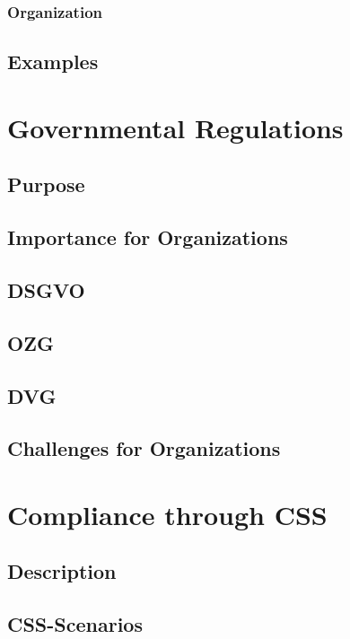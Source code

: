\documentclass[
     12pt,         %
     a4paper,      %
     BCOR10mm,     %
     DIV14,        %
     ]{scrreprt}
\begin{document}
\subsection{Organization}

\section{Examples}

\chapter{Governmental Regulations}

\section{Purpose}

\section{Importance for Organizations}

\section{DSGVO}

\section{OZG}

\section{DVG}

\section{Challenges for Organizations}

\chapter{Compliance through CSS}

\section{Description}

\section{CSS-Scenarios}
\end{document}

